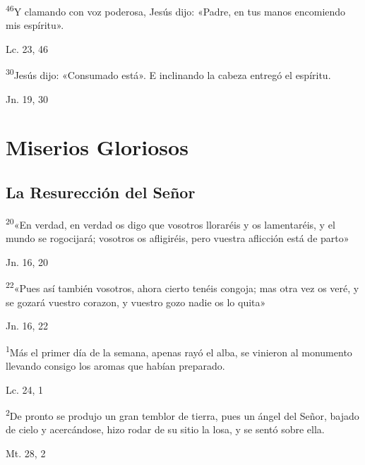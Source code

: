 \documentclass[a4paper,11pt]{article}
\begin{document}
      \textsuperscript{46}Y clamando con voz poderosa, Jesús dijo: «Padre, en tus manos encomiendo mis espíritu».
      \begin{flushright}
        Lc. 23, 46 
      \end{flushright}

      \textsuperscript{30}Jesús dijo: «Consumado está». E inclinando la cabeza entregó el espíritu.
      \begin{flushright}
        Jn. 19, 30
      \end{flushright}
 
    \newpage
         
  \section*{\hfil Miserios Gloriosos \hfil}
    \subsection*{\hfil La Resurección del Señor \hfil}
      
      \textsuperscript{20}«En verdad, en verdad os digo que vosotros lloraréis y os lamentaréis, y el mundo se rogocijará;
      vosotros os afligiréis, pero vuestra aflicción está de parto»
      \begin{flushright}
        Jn. 16, 20        
      \end{flushright}

      \textsuperscript{22}«Pues así también vosotros, ahora cierto tenéis congoja; mas otra vez os veré, y se gozará vuestro corazon,
      y vuestro gozo nadie os lo quita»
      \begin{flushright}
        Jn. 16, 22       
      \end{flushright}

      \textsuperscript{1}Más el primer día de la semana, apenas rayó el alba, se vinieron al monumento llevando consigo los aromas
      que habían preparado.
      \begin{flushright}
        Lc. 24, 1        
      \end{flushright}

      \textsuperscript{2}De pronto se produjo un gran temblor de tierra, pues un ángel del Señor, bajado de cielo y acercándose, hizo rodar
      de su sitio la losa, y se sentó sobre ella.
      \begin{flushright}
        Mt. 28, 2        
      \end{flushright}      
      
\end{document}
